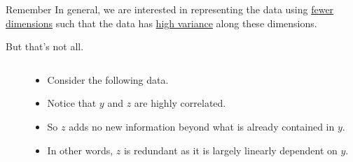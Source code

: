 \documentclass[10pt, aspectratio=169]{beamer}
\begin{document}
\begin{frame}
\begin{block}{Remember}
In general, we are interested in representing the data using \underline{fewer dimensions} such that the data has \underline{high variance} along these dimensions. 
\end{block}

But that's not all.
\end{frame}

\begin{frame}
\begin{columns}

    \begin{column}{0.5\textwidth}
      \centering
    \end{column}
      

    \begin{column}{0.5\textwidth}
      \begin{itemize}
        \item<1-> Consider the following data.
		\item<2-> Notice that $y$ and $z$ are highly correlated.
		\item<3-> So $z$ adds no new information beyond what is already contained in $y$.
		\item<4-> In other words, $z$ is redundant as it is largely linearly dependent on $y$.
        \end{itemize}
    \end{column}

  \end{columns}
\end{frame}
\end{document}
